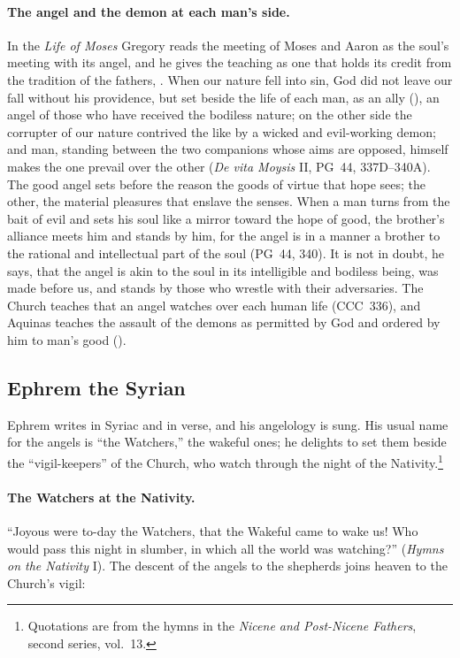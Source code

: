\paragraph{The angel and the demon at each man's side.} In the
\emph{Life of Moses} Gregory reads the meeting of Moses and Aaron as the
soul's meeting with its angel, and he gives the teaching as one that
holds its credit from the tradition of the fathers, . When our nature fell into sin, God did not leave our
fall without his providence, but set beside the life of each man, as an
ally (), an angel of those who have received the
bodiless nature; on the other side the corrupter of our nature contrived
the like by a wicked and evil-working demon; and man, standing between
the two companions whose aims are opposed, himself makes the one prevail
over the other (\emph{De vita Moysis} II, PG~44, 337D--340A). The good
angel sets before the reason the goods of virtue that hope sees; the
other, the material pleasures that enslave the senses. When a man turns
from the bait of evil and sets his soul like a mirror toward the hope of
good, the brother's alliance meets him and stands by him, for the angel is
in a manner a brother to the rational and intellectual part of the soul
(PG~44, 340). It is not in doubt, he
says, that the angel is akin to the soul in its intelligible and bodiless
being, was made before us, and stands by those who wrestle with their
adversaries. The Church teaches that an angel watches over each
human life (CCC~336), and Aquinas teaches the assault of the demons as
permitted by God and ordered by him to man's good ().

\sectionguard
\subsection{Ephrem the Syrian}\label{sec:fb-ephrem}

Ephrem writes in Syriac and in verse, and his angelology is sung. His
usual name for the angels is ``the Watchers,'' the wakeful ones; he
delights to set them beside the ``vigil-keepers'' of the Church, who watch
through the night of the Nativity.\footnote{Quotations are from the
hymns in the \emph{Nicene and Post-Nicene Fathers}, second series,
vol.~13.}

\paragraph{The Watchers at the Nativity.} ``Joyous were to-day the
Watchers, that the Wakeful came to wake us! Who would pass this night in
slumber, in which all the world was watching?'' (\emph{Hymns on the
Nativity} I). The descent of the angels to the shepherds joins heaven to
the Church's vigil:


